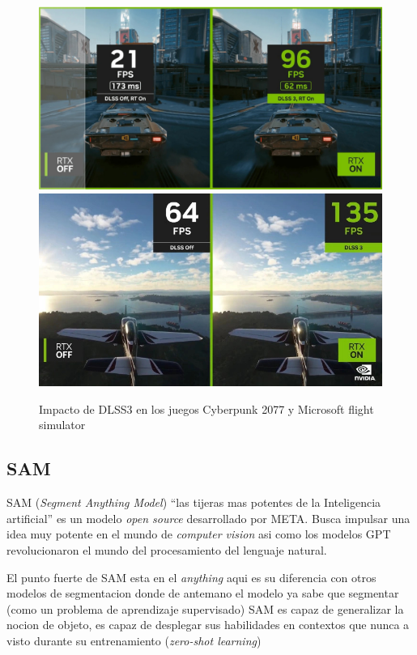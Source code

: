 \documentclass[runningheads]{llncs} %
\begin{document}
\begin{figure}
    \centering
    \includegraphics[scale=0.2]{ej1-dlss3.jpg}
    \includegraphics[scale=0.427]{ej2-dlss3.jpg}
    \caption{Impacto de DLSS3 en los juegos Cyberpunk 2077 y 
    Microsoft flight simulator \cite{img1-dlss3}}
    \label{fig:ej1-dlss3}
\end{figure}
\newpage

\subsection{SAM}
SAM (\textit{Segment Anything Model}) \textquotedblleft{}las tijeras mas
potentes de la Inteligencia artificial\textquotedblright{} es un modelo
\textit{open source} desarrollado por META.
Busca impulsar una idea muy potente en el mundo de \textit{computer vision} asi
como los modelos GPT revolucionaron el mundo del procesamiento del lenguaje natural.
\cite{ej-SAM}

El punto fuerte de SAM esta en el \textit{anything} aqui es su diferencia con otros
modelos de segmentacion donde de antemano el modelo ya sabe que segmentar (como
un problema de aprendizaje supervisado) SAM es capaz de generalizar la nocion de
objeto, es capaz de desplegar sus habilidades en contextos que nunca a visto durante
su entrenamiento (\textit{zero-shot learning}) \cite{ej-SAM}
\end{document}
